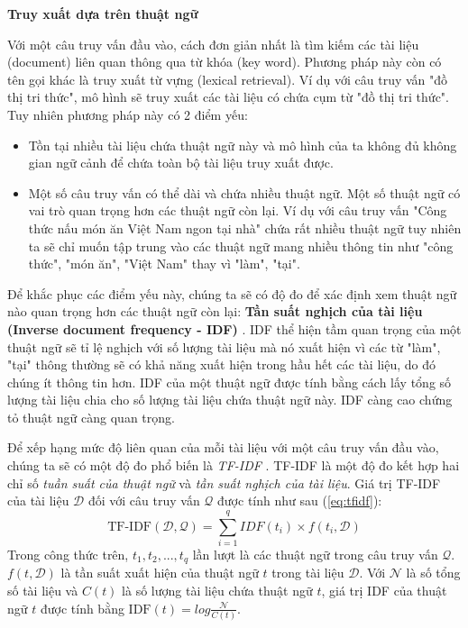 \vspace{1em}
\textbf{Truy xuất dựa trên thuật ngữ} 

Với một câu truy vấn đầu vào, cách đơn giản nhất là tìm kiếm các tài liệu (document) liên quan thông qua từ khóa (key word). Phương pháp này còn có tên gọi khác là truy xuất từ vựng (lexical retrieval). Ví dụ với câu truy vấn "đồ thị tri thức", mô hình sẽ truy xuất các tài liệu có chứa cụm từ "đồ thị tri thức". Tuy nhiên phương pháp này có 2 điểm yếu:
\begin{itemize}
    \item Tồn tại nhiều tài liệu chứa thuật ngữ này và mô hình của ta không đủ không gian ngữ cảnh để chứa toàn bộ tài liệu truy xuất được.
    \item Một số câu truy vấn có thể dài và chứa nhiều thuật ngữ. Một số thuật ngữ có vai trò quan trọng hơn các thuật ngữ còn lại. Ví dụ với câu truy vấn "Công thức nấu món ăn Việt Nam ngon tại nhà" chứa rất nhiều thuật ngữ tuy nhiên ta sẽ chỉ muốn tập trung vào các thuật ngữ mang nhiều thông tin như "công thức", "món ăn", "Việt Nam" thay vì "làm", "tại".
\end{itemize}

Để khắc phục các điểm yếu này, chúng ta sẽ có độ đo để xác định xem thuật ngữ nào quan trọng hơn các thuật ngữ còn lại: \textbf{Tần suất nghịch của tài liệu (Inverse document frequency - IDF)} \cite{ref_article40}. IDF thể hiện tầm quan trọng của một thuật ngữ sẽ tỉ lệ nghịch với số lượng tài liệu mà nó xuất hiện vì các từ "làm", "tại" thông thường sẽ có khả năng xuất hiện trong hầu hết các tài liệu, do đó chúng ít thông tin hơn. IDF của một thuật ngữ được tính bằng cách lấy tổng số lượng tài liệu chia cho số lượng tài liệu chứa thuật ngữ này. IDF càng cao chứng tỏ thuật ngữ càng quan trọng.

Để xếp hạng mức độ liên quan của mỗi tài liệu với một câu truy vấn đầu vào, chúng ta sẽ có một độ đo phổ biến là \textit{TF-IDF} \cite{ref_article41}. TF-IDF là một độ đo kết hợp hai chỉ số \textit{tuần suất của thuật ngữ} và \textit{tần suất nghịch của tài liệu}. Giá trị TF-IDF của tài liệu $\mathcal{D}$ đối với câu truy vấn $\mathcal{Q}$ được tính như sau (\ref{eq:tfidf}):
\begin{equation}
    \text{TF-IDF}(\mathcal{D, Q}) = \sum_{i=1}^{q} IDF(t_i) \times f(t_i, \mathcal{D})
    \label{eq:tfidf}
\end{equation}
Trong công thức trên, $t_1, t_2,..., t_q$ lần lượt là các thuật ngữ trong câu truy vấn $\mathcal{Q}$. $f(t, \mathcal{D})$ là tần suất xuất hiện của thuật ngữ $t$ trong tài liệu $\mathcal{D}$. Với $\mathcal{N}$ là số tổng số tài liệu và $C(t)$ là số lượng tài liệu chứa thuật ngữ $t$, giá trị IDF của thuật ngữ $t$ được tính bằng $\text{IDF}(t) = log \frac{\mathcal{N}}{C(t)}$.

